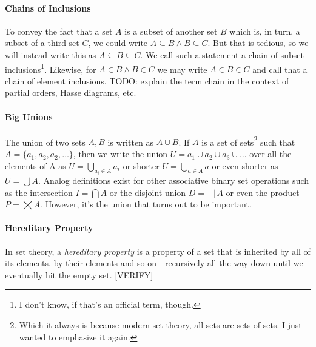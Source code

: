 \paragraph{Chains of Inclusions}
To convey the fact that a set $A$ is a subset of another set $B$ which is, in turn, a subset of a third set $C$, we could write $A \subseteq B \wedge B \subseteq C$. But that is tedious, so we will instead write this as $A \subseteq B \subseteq C$. We call such a statement a chain of subset inclusions\footnote{I don't know, if that's an official term, though.}. Likewise, for $A \in B \wedge B \in C$ we may write $A \in B \in C$ and call that a chain of element inclusions. TODO: explain the term chain in the context of partial orders, Hasse diagrams, etc.


\paragraph{Big Unions}
The union of two sets $A,B$ is written as $A \cup B$. If $A$ is a set of sets\footnote{Which it always is because modern set theory, all sets are sets of sets. I just wanted to emphasize it again.} such that $A = \{a_1, a_2, a_2, \ldots \}$, then we write the union $U = a_1 \cup a_2 \cup a_3 \cup \ldots$ over all the elements of A as $U = \bigcup_{a_i \in A} a_i$ or shorter $U = \bigcup_{a \in A} a$ or even shorter as $U = \bigcup A$. Analog definitions exist for other associative binary set operations such as the intersection $I = \bigcap A$ or the disjoint union $D = \bigsqcup A$ or even the product $P = \bigtimes A$. However, it's the union that turns out to be important. 

\paragraph{Hereditary Property}
In set theory, a \emph{hereditary property} is a property of a set that is inherited by all of its elements, by their elements and so on - recursively all the way down until we eventually hit the empty set. [VERIFY]




